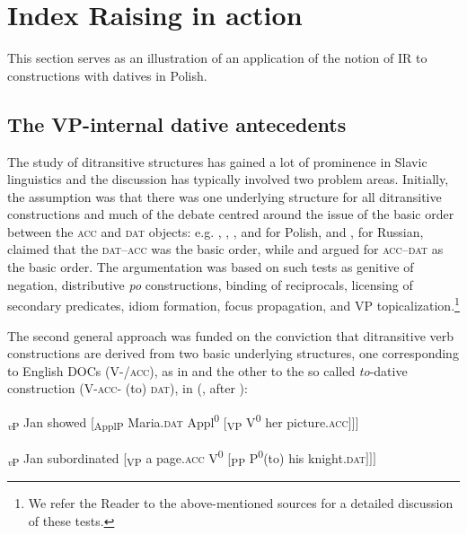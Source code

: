 \documentclass[output=paper,modfonts,nonflat
]{langsci/langscibook}
\begin{document}
\section{Index Raising in action}\label{sec:witkos:s3}

This section serves as an illustration of an application of the notion of IR to constructions with datives in Polish.   

\subsection{The VP-internal dative antecedents}\label{s3.1}

The study of ditransitive structures has gained a lot of prominence in Slavic linguistics and the discussion has typically involved two problem areas. Initially, the assumption was that there was one underlying structure for all ditransitive constructions and much of the debate  centred around the issue of the basic order between the \textsc{acc} and \textsc{dat} objects: e.g. \citet{willim1989}, \citet{witkos1998,witkos2007,witkos2008}, \citet{tajsner2008}, and \cite{citko2011} for Polish, and \citet{franks1995}, \citet{dyakonova2007,dyakonova2009} for Russian, claimed that the \textsc{dat}--\textsc{acc} was the basic order, while \citet{bailyn1996,bailyn2010,bailyn2012} and \cite{antonyuk2015} argued for \textsc{acc}--\textsc{dat} as the basic order. The argumentation was based on such tests as genitive of negation, distributive \textit{po} constructions, binding of reciprocals, licensing of secondary predicates, idiom formation, focus propagation, and VP topicalization.\footnote{\label{fn18}We refer the Reader to the above-mentioned sources for a detailed discussion of these tests.}

\largerpage[2]
The second general approach was funded on the conviction that ditransitive verb constructions are derived from two basic underlying structures, one corresponding to English DOCs (V-/\textsc{acc}), as in  and the other to the so called \textit{to}-dative construction (V-\textsc{acc}- (to) \textsc{dat}), in (, after \cite{dvorak2010}): 

\ea  \label{ex:witkos:21} \minsp{[} \textsubscript{\textit{v}P} Jan showed [\textsubscript{ApplP} Maria.\textsc{dat} Appl\textsuperscript{0} [\textsubscript{VP} V\textsuperscript{0} her picture.\textsc{acc}$]]]$\\
\z

\ea  \label{ex:witkos:22} \minsp{[} \textsubscript{\textit{v}P} Jan subordinated [\textsubscript{VP} a page.\textsc{acc} V\textsuperscript{0} [\textsubscript{PP} P\textsuperscript{0}(to) his knight.\textsc{dat}$]]]$\\
\z
\end{document}
